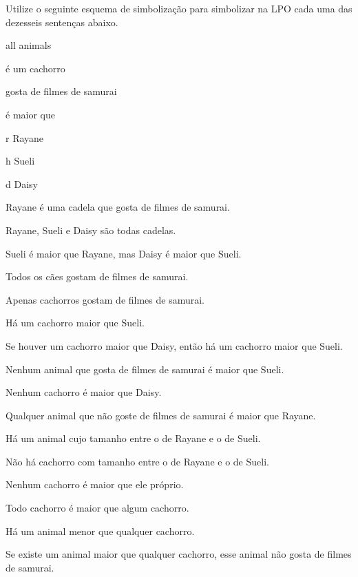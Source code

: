 \problempart 
Utilize o seguinte esquema de simbolização para simbolizar na LPO cada uma das dezesseis sentenças abaixo.
\begin{center}
\begin{ekey}
\item[\text{domínio}] all animals
\item[\atom{C}{x}]  é um cachorro
\item[\atom{S}{x}]  gosta de filmes de samurai
\item[\atom{L}{x,y}]  é maior que 
\item[r] Rayane
\item[h] Sueli
\item[d] Daisy
\end{ekey}
\end{center}
\begin{earg}
\item Rayane é uma cadela que gosta de filmes de samurai.
\item Rayane, Sueli e Daisy são todas cadelas.
\item Sueli é maior que Rayane, mas Daisy é maior que Sueli.
\item Todos os cães gostam de filmes de samurai.
\item Apenas cachorros gostam de filmes de samurai.
\item Há um cachorro maior que Sueli.
\item Se houver um cachorro maior que Daisy, então há um cachorro maior que Sueli.
\item Nenhum animal que gosta de filmes de samurai é maior que Sueli.
\item Nenhum cachorro é maior que Daisy.
\item Qualquer animal que não goste de filmes de samurai é maior que Rayane.
\item Há um animal cujo tamanho entre o de Rayane e o de Sueli.
\item Não há cachorro com tamanho entre o de Rayane e o de Sueli.
\item Nenhum cachorro é maior que ele próprio.
\item Todo cachorro é maior que algum cachorro.
\item Há um animal menor que qualquer cachorro.
\item Se existe um animal maior que qualquer cachorro, esse animal não gosta de filmes de samurai.\end{earg}

